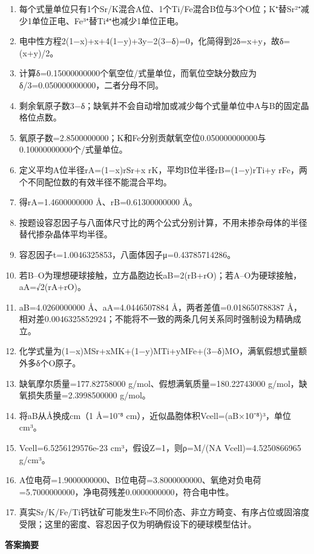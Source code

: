 \documentclass[UTF8,11pt,a4paper]{ctexart}
\begin{document}
\begin{enumerate}
\item 每个式量单位只有1个Sr/K混合A位、1个Ti/Fe混合B位与3个O位；K⁺替Sr²⁺减少1单位正电、Fe³⁺替Ti⁴⁺也减少1单位正电。
\item 电中性方程2(1−x)+x+4(1−y)+3y−2(3−δ)=0，化简得到2δ=x+y，故δ=(x+y)/2。
\item 计算δ=0.15000000000个氧空位/式量单位，而氧位空缺分数应为δ/3=0.050000000000，二者分母不同。
\item 剩余氧原子数3−δ；缺氧并不会自动增加或减少每个式量单位中A与B的固定晶格位点数。
\item 氧原子数=2.8500000000；K和Fe分别贡献氧空位0.050000000000与0.10000000000个/式量单位。
\item 定义平均A位半径rA=(1−x)rSr+x rK，平均B位半径rB=(1−y)rTi+y rFe，两个不同配位数的有效半径不能混合平均。
\item 得rA=1.4600000000 Å、rB=0.61300000000 Å。
\item 按题设容忍因子与八面体尺寸比的两个公式分别计算，不用未掺杂母体的半径替代掺杂晶体平均半径。
\item 容忍因子t=1.0046325853，八面体因子μ=0.43785714286。
\item 若B–O为理想硬球接触，立方晶胞边长aB=2(rB+rO)；若A–O为硬球接触，aA=√2(rA+rO)。
\item aB=4.0260000000 Å、aA=4.0446507884 Å，两者差值=0.018650788387 Å，相对差0.0046325852924；不能将不一致的两条几何关系同时强制设为精确成立。
\item 化学式量为(1−x)MSr+xMK+(1−y)MTi+yMFe+(3−δ)MO，满氧假想式量额外多δ个O原子。
\item 缺氧摩尔质量=177.82758000 g/mol、假想满氧质量=180.22743000 g/mol，缺氧损失质量=2.3998500000 g/mol。
\item 将aB从Å换成cm（1 Å=10⁻⁸ cm），近似晶胞体积Vcell=(aB×10⁻⁸)³，单位cm³。
\item Vcell=6.5256129576e-23 cm³，假设Z=1，则ρ=M/(NA Vcell)=4.5250866965 g/cm³。
\item A位电荷=1.9000000000、B位电荷=3.8000000000、氧绝对负电荷=5.7000000000，净电荷残差0.0000000000，符合电中性。
\item 真实Sr/K/Fe/Ti钙钛矿可能发生Fe不同价态、非立方畸变、有序占位或固溶度受限；这里的密度、容忍因子仅为明确假设下的硬球模型估计。
\end{enumerate}
\noindent\textbf{答案摘要}\par
\end{document}
